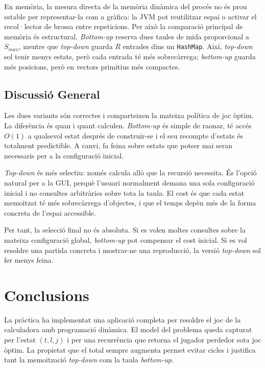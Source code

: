 \documentclass[conference,compsoc]{IEEEtran}
\begin{document}
En memòria, la mesura directa de la memòria dinàmica del procés no és prou estable
per representar-la com a gràfica: la JVM pot reutilitzar espai o activar el
recol·lector de brossa entre repeticions. Per això la comparació principal de
memòria és estructural. \textit{Bottom-up} reserva dues taules de mida
proporcional a $S_{max}$, mentre que \textit{top-down} guarda $R$ entrades dins un
\texttt{HashMap}. Així, \textit{top-down} sol tenir menys estats, però cada entrada
té més sobrecàrrega; \textit{bottom-up} guarda més posicions, però en vectors
primitius més compactes.

\subsection{Discussió General}

Les dues variants són correctes i comparteixen la mateixa política de joc òptim.
La diferència és quan i quant calculen. \textit{Bottom-up} és simple de raonar,
té accés $O(1)$ a qualsevol estat després de construir-se i el seu recompte
d'estats és totalment predictible. A canvi, fa feina sobre estats que potser mai
seran necessaris per a la configuració inicial.

\textit{Top-down} és més selectiu: només calcula allò que la recursió necessita.
És l'opció natural per a la GUI, perquè l'usuari normalment demana una sola
configuració inicial i no consultes arbitràries sobre tota la taula. El cost és
que cada estat memoitzat té més sobrecàrrega d'objectes, i que el temps depèn més
de la forma concreta de l'espai accessible.

Per tant, la selecció final no és absoluta. Si es volen moltes consultes sobre
la mateixa configuració global, \textit{bottom-up} pot compensar el cost inicial.
Si es vol resoldre una partida concreta i mostrar-ne una reproducció, la versió
\textit{top-down} sol fer menys feina.

\section{Conclusions}

La pràctica ha implementat una aplicació completa per resoldre el joc de la
calculadora amb programació dinàmica. El model del problema queda capturat per
l'estat $(t,l,j)$ i per una recurrència que retorna el jugador perdedor sota joc
òptim. La propietat que el total sempre augmenta permet evitar cicles i justifica
tant la memoització \textit{top-down} com la taula \textit{bottom-up}.
\end{document}
